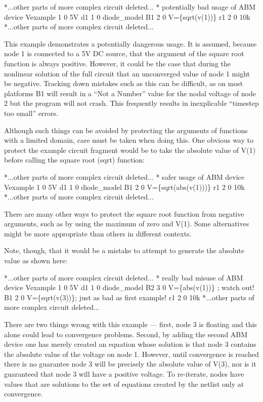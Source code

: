 \begin{vquote}
*...other parts of more complex circuit deleted...
\color{blue}* potentially bad usage of ABM device \color{black}
Vexample 1 0 5V
d1 1 0 diode_model
\color{red}B1 2 0 V=\{sqrt(v(1))\}\color{black}
r1 2 0 10k
*...other parts of more complex circuit deleted...
\end{vquote}

This example demonstrates a potentially dangerous usage. It is
assumed, because node 1 is connected to a 5V DC source, that the argument
of the square root function is always positive. However, it could be
the case that during the nonlinear solution of the full circuit that an
unconverged value of node 1 might be negative. Tracking down mistakes
such as this can be difficult, as on most
platforms B1 will result in a ``Not a Number'' value for the nodal voltage
of node 2 but the program will not crash. This frequently results in
inexplicable ``timestep too small'' errors.

Although such things can be avoided by protecting the arguments of
functions with a limited domain, care must be taken when doing this. One
obvious way to protect the example circuit fragment would be to take
the absolute value of V(1) before calling the square root (sqrt)
function:

\begin{vquote}
*...other parts of more complex circuit deleted...
\color{blue}* safer usage of ABM device \color{black}
Vexample 1 0 5V
d1 1 0 diode_model
B1 2 0 V=\{sqrt(abs(v(1)))\}
r1 2 0 10k
*...other parts of more complex circuit deleted...
\end{vquote}

There are many other ways to protect the square root function from
negative arguments, such as by using the maximum of zero and V(1).
Some alternatives might be more appropriate than others in different
contexts.

Note, though, that it would be a mistake to attempt to generate the absolute 
value as shown here: 
\begin{vquote}
*...other parts of more complex circuit deleted...
\color{blue}* really bad misuse of ABM device \color{black}
Vexample 1 0 5V
d1 1 0 diode_model
\color{red}B2 3 0 V=\{abs(v(1))\} ; watch out!
B1 2 0 V=\{sqrt(v(3))\}; just as bad as first example!\color{black}
r1 2 0 10k
*...other parts of more complex circuit deleted...
\end{vquote}

There are two things wrong with this example --- first, node 3 is floating
and this alone could lead to convergence problems. Second, by adding
the second ABM device one has merely created an equation whose
solution is that node 3 contains the absolute value of the voltage on
node 1. However, until convergence is reached there is no guarantee
node 3 will be precisely the absolute value of V(3), nor is it
guaranteed that node 3 will have a positive voltage. To re-iterate, nodes have 
values that are solutions to the set of equations created by the netlist only at
convergence.

